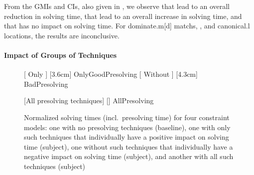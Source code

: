 From the \glspl{GMI} and \glspl{CI}, also given in
, we observe
that  lead to an
overall reduction in solving time, that
 lead to an
overall increase in solving time, and that
 has no impact on solving time.
%
For \gls{dominate.m}[d] \glspl{match},
,
and \gls{canonical.l} \glspl{location}, the results are inconclusive.


\paragraph{Impact of Groups of Techniques}


\begin{figure}
  \centering%

                      [%
                        Only %
                      ]%
                      [3.6cm]%
                      {OnlyGoodPresolving}%
  \hfill%
                      [%
                        Without %
                      ]%
                      [4.3cm]%
                      {BadPresolving}%

  \vspace{\betweensubfigures}

                      [All presolving techniques]%
                      [\linewidth]%
                      {AllPresolving}%

  \caption[%
            Plot for evaluating the impact on solving time made by different
            combinations of presolving techniques%
          ]%
          {%
            Normalized solving times (incl.\ presolving time) for four
            constraint models: one with no presolving techniques (baseline), one
            with only such techniques that individually have a positive impact
            on solving time (subject), one without such techniques that
            individually have a negative impact on solving time (subject), and
            another with all such techniques (subject)%
          }
\end{figure}

